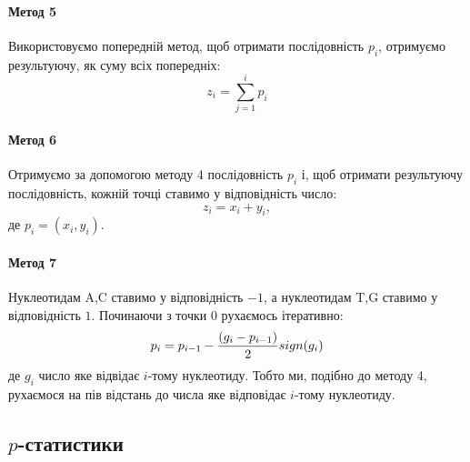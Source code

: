 \documentclass[14pt,a4paper,titlepage]{extarticle}
\begin{document}
\paragraph{Метод 5}
Використовуємо попередній метод, щоб отримати послідовність $p_i$, отримуємо результуючу, як суму всіх попередніх:
\[z_i = \sum_{j=1}^{i} p_i\]
\paragraph{Метод 6}
Отримуємо за допомогою методу 4 послідовність $p_i$ і, щоб отримати результуючу послідовність, кожній точці ставимо у відповідність число:
\[z_i = x_i + y_i,\]
де $p_i = (x_i,y_i)$.
\paragraph{Метод 7}
Нуклеотидам A,C ставимо у відповідність $-1$, а нуклеотидам T,G ставимо у відповідність $1$. Починаючи з точки $0$ рухаємось ітеративно:
\[p_i = p_{i-1} - {(g_i-p_{i-1}) \over{2}}sign(g_i)\]
де $g_i$ число яке відвідає $i$-тому нуклеотиду. Тобто ми, подібно до методу 4, рухаємося на пів відстань до числа яке відповідає $i$-тому нуклеотиду.

\subsection{$p$-статистики}
\end{document}
